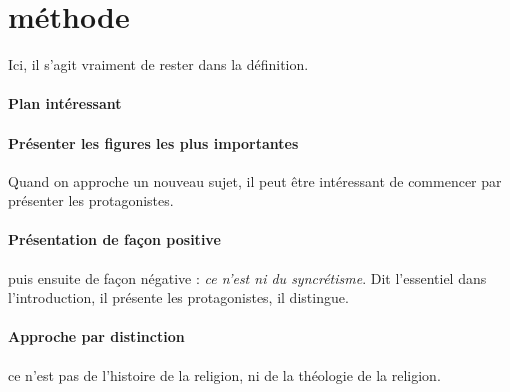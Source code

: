 \section{méthode}

Ici, il s'agit vraiment de rester dans la définition. 

\paragraph{Plan intéressant}

\paragraph{Présenter les figures les plus importantes} Quand on approche un nouveau sujet, il peut être intéressant de commencer par présenter les protagonistes.

\paragraph{Présentation de façon positive} puis ensuite de façon négative : \textit{ce n'est ni du syncrétisme}. Dit l'essentiel dans l'introduction, il présente les protagonistes, il distingue. 

\paragraph{Approche par distinction} ce n'est pas de l'histoire de la religion, ni de la théologie de la religion.





 
















